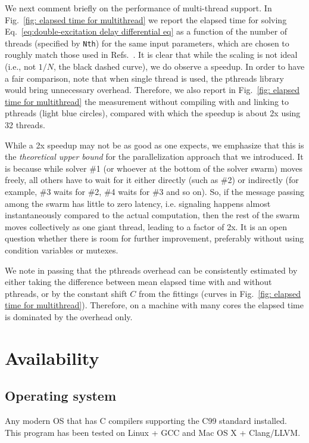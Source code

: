 \documentclass[12pt,letter,onecolumn,notitlepage]{article}
\begin{document}
We next comment briefly on the performance of multi-thread support. In Fig.~\ref{fig: elapsed time for multithread} we report the elapsed time for solving Eq.~\eqref{eq:double-excitation delay differential eq} as a function of the number of threads (specified by \texttt{Nth}) for the same input parameters, which are chosen to roughly match those used in Refs.~\cite{FangNM17,FangPRA15err,OurBIC}. It is clear that while the scaling is not ideal (i.e., not $1/N$, the black dashed curve), we do observe a speedup. In order to have a fair comparison, note that when single thread is used, the pthreads library would bring unnecessary overhead. Therefore, we also report in Fig.~\ref{fig: elapsed time for multithread} the measurement without compiling with and linking to pthreads (light blue circles), compared with which the speedup is about 2x using 32 threads. 

While a 2x speedup may not be as good as one expects, we emphasize that this is the \emph{theoretical upper bound} for the parallelization approach that we introduced. It is because while solver \#1 (or whoever at the bottom of the solver swarm) moves freely, all others have to wait for it either directly (such as \#2) or indirectly (for example, \#3 waits for \#2, \#4 waits for \#3 and so on). So, if the message passing among the swarm has little to zero latency, i.e. signaling happens almost instantaneously compared to the actual computation, then the rest of the swarm moves collectively as one giant thread, leading to a factor of 2x. It is an open question whether there is room for further improvement, preferably without using condition variables or mutexes.

We note in passing that the pthreads overhead can be consistently estimated by either taking the difference between mean elapsed time with and without pthreads, or by the constant shift $C$ from the fittings (curves in Fig.~\ref{fig: elapsed time for multithread}). Therefore, on a machine with many cores the elapsed time is dominated by the overhead only. 


\section{Availability}
\subsection{Operating system}
Any modern OS that has C compilers supporting the C99 standard installed. This program has been tested on Linux + GCC and Mac OS X + Clang/LLVM.
\end{document}
